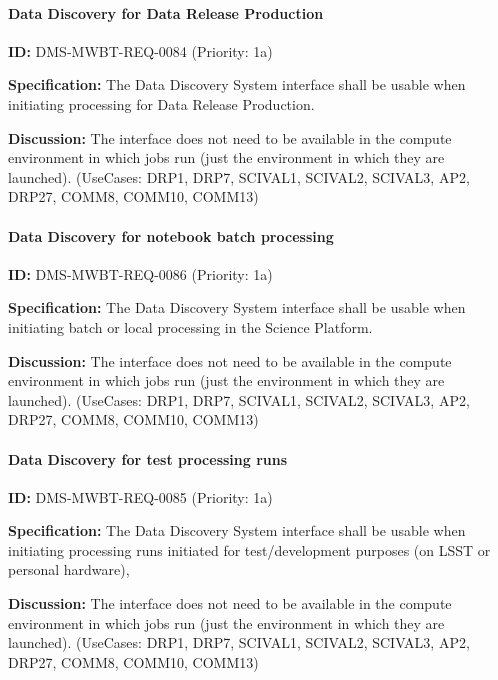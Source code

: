 \documentclass[SE,toc,lsstdraft]{lsstdoc}
\begin{document}
\paragraph{Data Discovery for Data Release Production}\hfill  %

\label{DMS-MWBT-REQ-0084}
\textbf{ID:} DMS-MWBT-REQ-0084 (Priority: 1a)

\textbf{Specification:}
The Data Discovery System interface shall be usable when initiating processing for Data Release Production.

\textbf{Discussion:}
The interface does not need to be available in the compute environment in which jobs run (just the environment in which they are launched). (UseCases: DRP1, DRP7, SCIVAL1, SCIVAL2, SCIVAL3, AP2, DRP27, COMM8, COMM10, COMM13)

\paragraph{Data Discovery for notebook batch processing}\hfill  %

\label{DMS-MWBT-REQ-0086}
\textbf{ID:} DMS-MWBT-REQ-0086 (Priority: 1a)

\textbf{Specification:}
The Data Discovery System interface shall be usable when initiating batch or local processing in the Science Platform.

\textbf{Discussion:}
The interface does not need to be available in the compute environment in which jobs run (just the environment in which they are launched). (UseCases: DRP1, DRP7, SCIVAL1, SCIVAL2, SCIVAL3, AP2, DRP27, COMM8, COMM10, COMM13)

\paragraph{Data Discovery for test processing runs}\hfill  %

\label{DMS-MWBT-REQ-0085}
\textbf{ID:} DMS-MWBT-REQ-0085 (Priority: 1a)

\textbf{Specification:}
The Data Discovery System interface shall be usable when initiating processing runs initiated for test/development purposes (on LSST or personal hardware),

\textbf{Discussion:}
The interface does not need to be available in the compute environment in which jobs run (just the environment in which they are launched). (UseCases: DRP1, DRP7, SCIVAL1, SCIVAL2, SCIVAL3, AP2, DRP27, COMM8, COMM10, COMM13)
\end{document}
